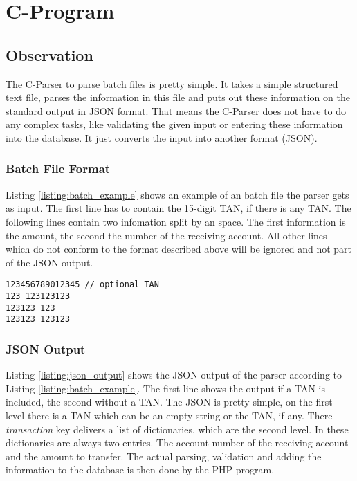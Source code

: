 \chapter{C-Program}

\section{Observation}

The C-Parser to parse batch files is pretty simple. It takes a simple structured text file, parses the information in this file and puts out these information on the standard output in JSON format. That means the C-Parser does not have to do any complex tasks, like validating the given input or entering these information into the database. It just converts the input into another format (JSON).

\subsection{Batch File Format}

Listing \ref{listing:batch_example} shows an example of an batch file the parser gets as input. The first line has to contain the 15-digit TAN, if there is any TAN. The following lines contain two infomation split by an space. The first information is the amount, the second the number of the receiving account. All other lines which do not conform to the format described above will be ignored and not part of the JSON output.

\begin{lstlisting}[caption=Input Batch File,label=listing:batch_example]
123456789012345 // optional TAN
123 123123123
123123 123
123123 123123
\end{lstlisting}

\subsection{JSON Output}

Listing \ref{listing:json_output} shows the JSON output of the parser according to Listing \ref{listing:batch_example}. The first line shows the output if a TAN is included, the second without a TAN. The JSON is pretty simple, on the first level there is a TAN which can be an empty string or the TAN, if any. There \textit{transaction} key delivers a list of dictionaries, which are the second level. In these dictionaries are always two entries. The account number of the receiving account and the amount to transfer. The actual parsing, validation and adding the information to the database is then done by the PHP program.

